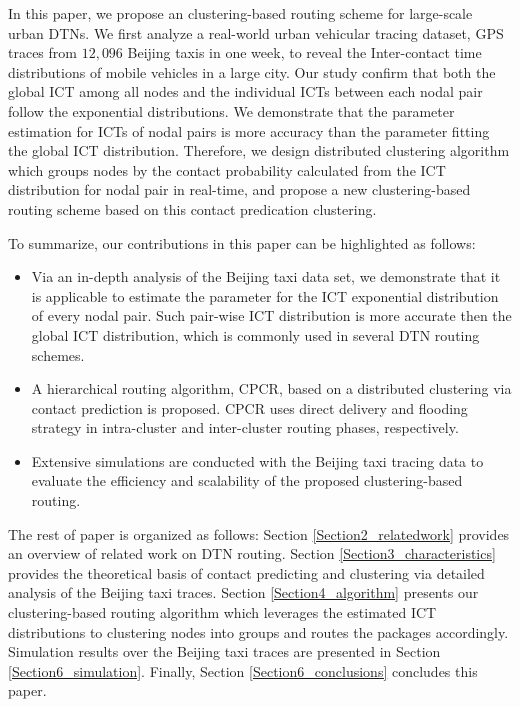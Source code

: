 \documentclass[conference]{IEEEtran}
\begin{document}
In this paper, we propose an clustering-based routing scheme for large-scale urban DTNs.  We first
analyze a real-world urban vehicular tracing dataset, GPS traces from $12,096$ Beijing taxis in one week, to reveal the Inter-contact time distributions of mobile vehicles in a large city. Our study confirm that both the global ICT among all nodes and the individual ICTs between each nodal pair follow the exponential distributions.
We demonstrate that the parameter estimation for ICTs of nodal pairs is more accuracy than the parameter fitting the global ICT distribution. Therefore, we design distributed clustering algorithm which groups nodes by the contact probability calculated from the ICT distribution for nodal pair in real-time, and propose a new clustering-based routing scheme based on this contact predication clustering.

To summarize, our contributions in this paper can be highlighted as follows:
    \begin{itemize}
      \item
         Via an in-depth analysis of the Beijing taxi data set, we demonstrate that it is applicable to estimate the parameter for the ICT exponential distribution of every nodal pair. Such pair-wise ICT distribution is more accurate then the global ICT distribution, which is commonly used in several DTN routing schemes.
      \item
         A hierarchical routing algorithm, CPCR, based on a distributed clustering via contact prediction is proposed.  CPCR uses direct delivery and flooding strategy in intra-cluster and inter-cluster routing phases, respectively.
      \item %
        Extensive simulations are conducted with the Beijing taxi tracing data to evaluate the efficiency and scalability of the proposed clustering-based routing.
    \end{itemize}

The rest of paper is organized as follows: Section \ref{Section2_relatedwork} provides an overview of related work on DTN routing.
Section \ref{Section3_characteristics} provides the theoretical basis of contact predicting and clustering via detailed analysis of the Beijing taxi traces. Section \ref{Section4_algorithm} presents our clustering-based routing algorithm which leverages the estimated ICT distributions to clustering nodes into groups and routes the packages accordingly. Simulation results over the Beijing taxi traces are presented in Section \ref{Section6_simulation}. Finally, Section \ref{Section6_conclusions} concludes this paper.
\end{document}
